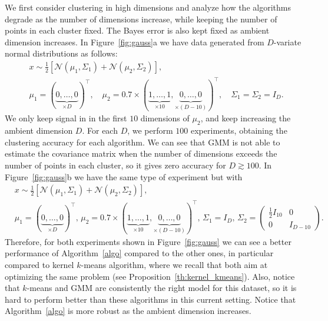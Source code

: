 \documentclass[aps,preprint,nofootinbib,floatfix]{revtex4-1}
\begin{document}
We first consider clustering in high dimensions and analyze 
how the algorithms degrade as the number of dimensions increase, while
keeping the number of points in each cluster fixed. The Bayes error
is also kept fixed as ambient dimension increases.
In Figure~\ref{fig:gauss}a we have data generated from $D$-variate normal 
distributions as follows: 
\begin{equation}
\label{eq:gauss1}
\begin{split}
&x \sim \tfrac{1}{2}\left[ 
\mathcal{N}(\mu_1,\Sigma_1) + \mathcal{N}(\mu_2, \Sigma_2)\right], \\
&\mu_1 = (\underbrace{0,\dotsc,0}_{\times D})^\top , \quad
\mu_2 = 0.7 \times (\underbrace{1,\dots,1}_{\times 10},
\underbrace{0,\dots,0}_{\times (D-10)})^\top, \quad
\Sigma_1 = \Sigma_2 = I_D.
\end{split}
\end{equation}
We only keep signal in
in the first $10$
dimensions of $\mu_2$, and keep increasing the ambient dimension $D$. For each
$D$, we perform $100$ experiments, obtaining the clustering accuracy
for each algorithm.
We can see that
GMM is not able to estimate the covariance matrix 
when the number
of dimensions exceeds the number of points in each cluster, so it gives
zero accuracy for $D \gtrsim 100$.
In Figure~\ref{fig:gauss}b we have the same type of experiment but 
with 
\begin{equation}
\label{eq:gauss2}
\begin{split}
&x \sim \tfrac{1}{2}\left[ 
\mathcal{N}(\mu_1,\Sigma_1) + \mathcal{N}(\mu_2, \Sigma_2)\right], \\
&\mu_1 = (\underbrace{0,\dotsc,0}_{\times D})^\top , \,
\mu_2 = 0.7 \times (\underbrace{1,\dots,1}_{\times 10},
\underbrace{0,\dots,0}_{\times (D-10)})^\top, \,
\Sigma_1 = I_D, \, 
\Sigma_2 = \left( \begin{smallmatrix} \tfrac{1}{2} I_{10} & 0 \\ 0 & I_{D-10}
\end{smallmatrix}\right). \quad
\end{split}
\end{equation}
Therefore, for both experiments shown in Figure~\ref{fig:gauss}
we can see a better performance of Algorithm~\ref{algo} compared
to the other ones, in particular compared to kernel $k$-means algorithm,
where we recall that both
aim at optimizing the same problem (see Proposition~\ref{th:kernel_kmeans}). 
Also, notice that $k$-means
and GMM are consistently the right model for this dataset, so it is hard
to perform better than these algorithms in this current setting.
Notice that Algorithm~\ref{algo} is more robust as the ambient
dimension increases.
\end{document}

